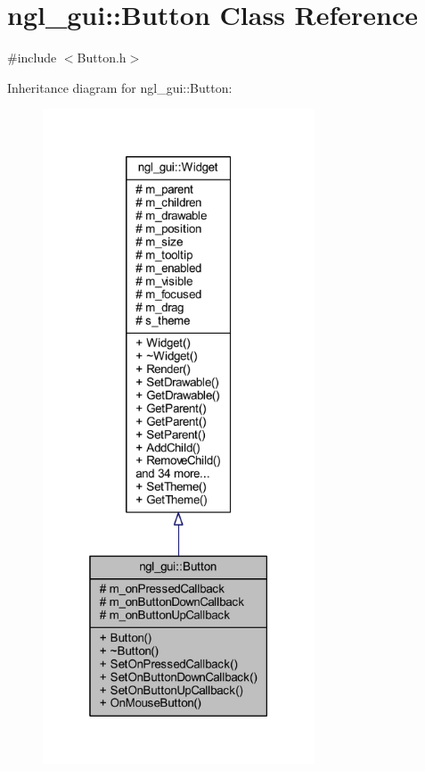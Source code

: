 \hypertarget{classngl__gui_1_1_button}{}\section{ngl\+\_\+gui\+:\+:Button Class Reference}
\label{classngl__gui_1_1_button}


{\ttfamily \#include $<$Button.\+h$>$}



Inheritance diagram for ngl\+\_\+gui\+:\+:Button\+:\nopagebreak
\begin{figure}[H]
\begin{center}
\leavevmode
\includegraphics[height=550pt]{classngl__gui_1_1_button__inherit__graph}
\end{center}
\end{figure}


